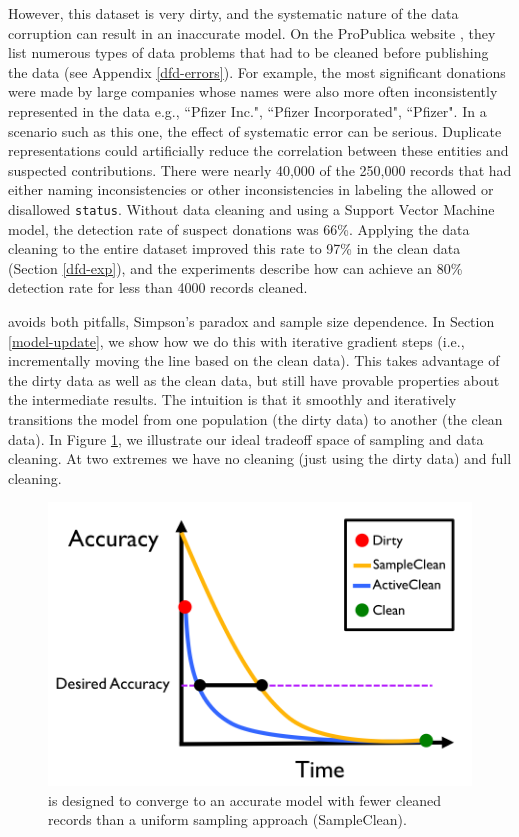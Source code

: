 However, this dataset is very dirty, and the systematic nature of the data corruption can result in an inaccurate model.
On the ProPublica website \cite{dollarsfordocs}, they list numerous types of data problems that had to be cleaned before publishing the data (see Appendix \ref{dfd-errors}).
For example, the most significant donations were made by large companies whose names were also more often inconsistently represented in the data e.g., ``Pfizer Inc.", ``Pfizer Incorporated", ``Pfizer".
In a scenario such as this one, the effect of systematic error can be serious.
Duplicate representations could artificially reduce the correlation between these entities and suspected contributions.
There were nearly 40,000 of the 250,000 records that had either naming inconsistencies or other inconsistencies in labeling the allowed or disallowed \texttt{status}.
Without data cleaning and using a Support Vector Machine model, the detection rate of suspect donations was 66\%.
Applying the data cleaning to the entire dataset improved this rate to 97\% in the clean data (Section \ref{dfd-exp}), and the experiments describe how \sys can achieve an 80\% detection rate for less than 4000 records cleaned.



\iffalse
\sys avoids both pitfalls, Simpson's paradox and sample size dependence.
In Section \ref{model-update}, we show how we do this with iterative gradient steps (i.e., incrementally moving the line based on the clean data).
This takes advantage of the dirty data as well as the clean data, but still have provable properties about the intermediate results.
The intuition is that it smoothly and iteratively transitions the model from one population (the dirty data) to another (the clean data).
In Figure \ref{sys-arch2}, we illustrate our ideal tradeoff space of sampling and data cleaning.
At two extremes we have no cleaning (just using the dirty data) and full cleaning.

\begin{figure}[t]
\centering
 \includegraphics[width=0.5\columnwidth]{figs/arch2.png}
 \caption{\sys is designed to converge to an accurate model with fewer cleaned records than a uniform sampling approach (SampleClean). \label{sys-arch2}}\vspace{-1em}
\end{figure}


